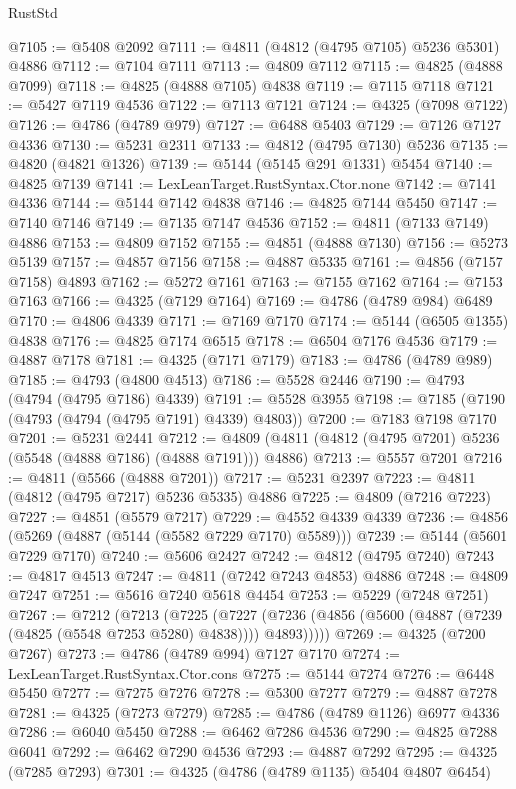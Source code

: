 \begin{lexlean}{RustStd}
\begin{coremodule}
@7105 := @5408 @2092
@7111 := @4811 (@4812 (@4795 @7105) @5236 @5301) @4886
@7112 := @7104 @7111
@7113 := @4809 @7112
@7115 := @4825 (@4888 @7099)
@7118 := @4825 (@4888 @7105) @4838
@7119 := @7115 @7118
@7121 := @5427 @7119 @4536
@7122 := @7113 @7121
@7124 := @4325 (@7098 @7122)
@7126 := @4786 (@4789 @979)
@7127 := @6488 @5403
@7129 := @7126 @7127 @4336
@7130 := @5231 @2311
@7133 := @4812 (@4795 @7130) @5236
@7135 := @4820 (@4821 @1326)
@7139 := @5144 (@5145 @291 @1331) @5454
@7140 := @4825 @7139
@7141 := LexLeanTarget.RustSyntax.Ctor.none
@7142 := @7141 @4336
@7144 := @5144 @7142 @4838
@7146 := @4825 @7144 @5450
@7147 := @7140 @7146
@7149 := @7135 @7147 @4536
@7152 := @4811 (@7133 @7149) @4886
@7153 := @4809 @7152
@7155 := @4851 (@4888 @7130)
@7156 := @5273 @5139
@7157 := @4857 @7156
@7158 := @4887 @5335
@7161 := @4856 (@7157 @7158) @4893
@7162 := @5272 @7161
@7163 := @7155 @7162
@7164 := @7153 @7163
@7166 := @4325 (@7129 @7164)
@7169 := @4786 (@4789 @984) @6489
@7170 := @4806 @4339
@7171 := @7169 @7170
@7174 := @5144 (@6505 @1355) @4838
@7176 := @4825 @7174 @6515
@7178 := @6504 @7176 @4536
@7179 := @4887 @7178
@7181 := @4325 (@7171 @7179)
@7183 := @4786 (@4789 @989)
@7185 := @4793 (@4800 @4513)
@7186 := @5528 @2446
@7190 := @4793 (@4794 (@4795 @7186) @4339)
@7191 := @5528 @3955
@7198 := @7185 (@7190 (@4793 (@4794 (@4795 @7191) @4339) @4803))
@7200 := @7183 @7198 @7170
@7201 := @5231 @2441
@7212 := @4809 (@4811 (@4812 (@4795 @7201) @5236 (@5548 (@4888 @7186) (@4888 @7191))) @4886)
@7213 := @5557 @7201
@7216 := @4811 (@5566 (@4888 @7201))
@7217 := @5231 @2397
@7223 := @4811 (@4812 (@4795 @7217) @5236 @5335) @4886
@7225 := @4809 (@7216 @7223)
@7227 := @4851 (@5579 @7217)
@7229 := @4552 @4339 @4339
@7236 := @4856 (@5269 (@4887 (@5144 (@5582 @7229 @7170) @5589)))
@7239 := @5144 (@5601 @7229 @7170)
@7240 := @5606 @2427
@7242 := @4812 (@4795 @7240)
@7243 := @4817 @4513
@7247 := @4811 (@7242 @7243 @4853) @4886
@7248 := @4809 @7247
@7251 := @5616 @7240 @5618 @4454
@7253 := @5229 (@7248 @7251)
@7267 := @7212
    (@7213
      (@7225
        (@7227 (@7236 (@4856 (@5600 (@4887 (@7239 (@4825 (@5548 @7253 @5280) @4838)))) @4893)))))
@7269 := @4325 (@7200 @7267)
@7273 := @4786 (@4789 @994) @7127 @7170
@7274 := LexLeanTarget.RustSyntax.Ctor.cons
@7275 := @5144 @7274
@7276 := @6448 @5450
@7277 := @7275 @7276
@7278 := @5300 @7277
@7279 := @4887 @7278
@7281 := @4325 (@7273 @7279)
@7285 := @4786 (@4789 @1126) @6977 @4336
@7286 := @6040 @5450
@7288 := @6462 @7286 @4536
@7290 := @4825 @7288 @6041
@7292 := @6462 @7290 @4536
@7293 := @4887 @7292
@7295 := @4325 (@7285 @7293)
@7301 := @4325 (@4786 (@4789 @1135) @5404 @4807 @6454)

\end{coremodule}
\end{lexlean}

